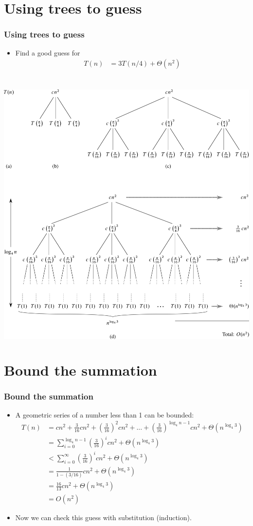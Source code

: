 \documentclass{beamer}
\newcommand{\sect}[1]{
\section{#1}
\begin{frame}[fragile]\frametitle{#1}
}
\newcommand{\bi}{\begin{itemize}}
\newcommand{\ii}{\item}
\newcommand{\ei}{\end{itemize}}
\begin{document}
\sect{Using trees to guess}
\bi
\ii  Find a good guess for
\begin{align*}
  T(n) &= 3T(n/4) + \Theta(n^2)
\end{align*}
\ei

\end{frame}
\sect{}
\includegraphics[height=0.9\textheight]{Fig-4-5.pdf}
\end{frame}

\sect{Bound the summation}
\small
\bi
\ii
A geometric series of a number less than 1 can be bounded:
\begin{align*}
  T(n) &= cn^2 + \frac{3}{16}cn^2 + \left(\frac{3}{16}\right)^2cn^2 + ...
  + \left(\frac{3}{16}\right)^{\log_4 n - 1}cn^2 + \Theta(n^{\log_4 3})\\
  &= \sum_{i=0}^{\log_4n - 1} \left(\frac{3}{16}\right)^icn^2
  + \Theta(n^{\log_4 3})\\
  &< \sum_{i=0}^{\infty} \left(\frac{3}{16}\right)^icn^2
  + \Theta(n^{\log_4 3})\\
  &= \frac{1}{1-(3/16)}cn^2  + \Theta(n^{\log_4 3})\\
  &= \frac{16}{13}cn^2  + \Theta(n^{\log_4 3})\\
  &= O(n^2)
\end{align*}
\ii
Now we can check this guess with substitution (induction).
\ei
\end{frame}
\end{document}
